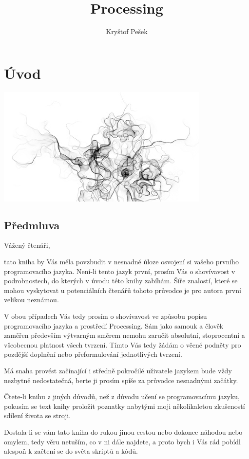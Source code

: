 \documentclass[12pt,twopage]{book}
\title{Processing}
\author{Kryštof Pešek}
\date{} %
\newcommand{\oddil}[1]{\section{#1}\label{sec:#1}}
\begin{document}

\tableofcontents


\chapter{Úvod}



\vfill
\thispagestyle{empty}
\begin{center}
\includegraphics[scale = 0.5]{imgs/thePainOfFleetingJoy_1.jpg}
\end{center}


\oddil{Předmluva}




Vážený čtenáři,

tato kniha by Vás měla povzbudit v nesnadné úloze osvojení si vašeho prvního programovacího jazyka. Není-li tento jazyk první, prosím Vás o shovívavost v podrobnostech, do kterých v úvodu této knihy zabíhám. Šíře znalostí, které se mohou vyskytovat u potenciálních čtenářů tohoto průvodce je pro autora první velikou neznámou.

V obou případech Vás tedy prosím o shovívavost ve způsobu popisu programovacího jazyka a prostředí Processing. Sám jako samouk a člověk zaměřen především výtvarným směrem nemohu zaručit absolutní, stoprocentní a všeobecnou platnost všech tvrzení. Tímto Vás tedy žádám o věcné podněty pro pozdější doplnění nebo přeformulování jednotlivých tvrzení.

Má snaha provést začínající i středně pokročilé uživatele jazykem bude vždy nezbytně nedostatečná, berte ji prosím spíše za průvodce nesnadnými začátky.

Čtete-li knihu z jiných důvodů, než z důvodu učení se programovacímu jazyku, pokusím se text knihy proložit poznatky nabytými moji několikaletou zkušeností sdílení života se stroji.

Dostala-li se vám tato kniha do rukou jinou cestou nebo dokonce náhodou nebo omylem, tedy věru netuším, co v ni dále najdete, a proto bych i Vás rád pobídl alespoň k začtení se do světa skriptů a kódů.
\end{document}
